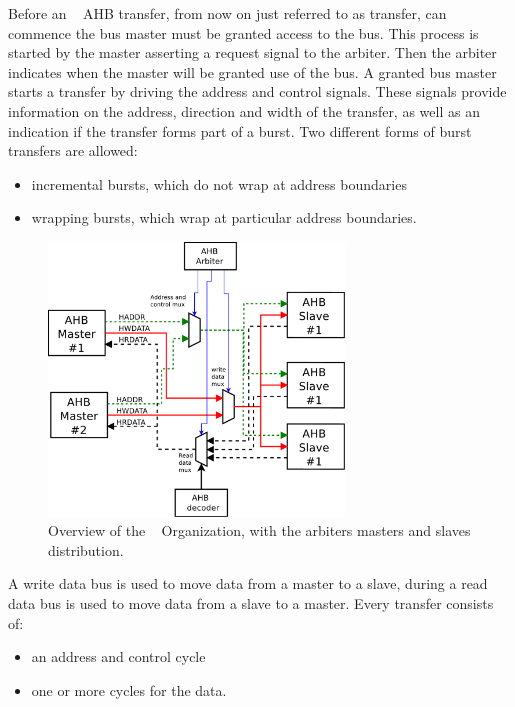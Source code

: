 Before an \amba~ AHB transfer, from now on just referred to as transfer, can commence the bus master must be granted access to the bus. This process is started by the master asserting a request signal to the arbiter. Then the arbiter indicates when the master will be granted use of the bus. A granted bus master starts a transfer by driving the address and control signals. These signals provide information on the address, direction and width of the transfer, as well as an indication if the transfer forms part of a burst. Two different forms of burst transfers are allowed:
\begin{itemize}
\item incremental bursts, which do not wrap at address boundaries
\item wrapping bursts, which wrap at particular address boundaries.
\end{itemize}
\begin{figure}[!ht]
    \centering
    \includegraphics[width=0.7\textwidth]{figures/pdf/amba2_arbiter.pdf}
    \caption{Overview  of the \amba~ Organization, with the arbiters masters and slaves distribution.}
    \label{fig:internorg}
\end{figure}

A write data bus is used to move data from a master to a slave, during a read data bus
is used to move data from a slave to a master.
Every transfer consists of:

\begin{itemize}
\item an address and control cycle
\item one or more cycles for the data.
\end{itemize}



